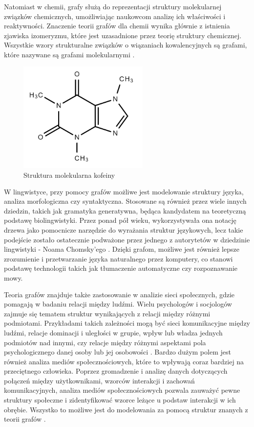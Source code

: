 Natomiast w chemii, grafy służą do reprezentacji struktury molekularnej związków chemicznych,
umożliwiając naukowcom analizę ich właściwości i reaktywności.
Znaczenie teorii grafów dla chemii wynika głównie z istnienia zjawiska izomeryzmu,
które jest uzasadnione przez teorię struktury chemicznej.
Wszystkie wzory strukturalne związków o wiązaniach kowalencyjnych są grafami,
które nazywane są grafami molekularnymi \cite{Balaban1985}.

\begin{figure}[ht]
	\centering
	\includegraphics[height=5.5cm]{partials/images/intro_chem.png}
	\caption{Struktura molekularna kofeiny}
    \label{Fig:intro-4}
\end{figure}

W lingwistyce, przy pomocy grafów możliwe jest modelowanie struktury języka, analiza morfologiczna czy syntaktyczna.
Stosowane są również przez wiele innych dziedzin, takich jak gramatyka generatywna,
będąca kandydatem na teoretyczną podstawę biolingwistyki.
Przez ponad pół wieku, wykorzystywała ona notację drzewa jako pomocnicze narzędzie do wyrażania struktur językowych,
lecz takie podejście zostało ostatecznie podważone przez jednego z autorytetów w dziedzinie lingwistyki - Noama Chomsky'ego \cite{Arikawa2019}.
Dzięki grafom, możliwe jest również lepsze zrozumienie i przetwarzanie języka naturalnego przez komputery,
co stanowi podstawę technologii takich jak tłumaczenie automatyczne czy rozpoznawanie mowy.

Teoria grafów znajduje także zastosowanie w analizie sieci społecznych, gdzie pomagają w badaniu relacji między ludźmi.
Wielu psychologów i socjologów zajmuje się tematem struktur wynikających z relacji między różnymi podmiotami.
Przykładami takich zależności mogą być sieci komunikacyjne między ludźmi, relacje dominacji i uległości w grupie,
wpływ lub władza jednych podmiotów nad innymi, czy relacje między różnymi aspektami pola psychologicznego danej osoby lub jej osobowości \cite{Harary1953}.
Bardzo dużym polem jest również analiza mediów społecznościowych, które to wpływają coraz bardziej na przeciętnego człowieka.
Poprzez gromadzenie i analizę danych dotyczących połączeń między użytkownikami, wzorców interakcji i zachowań komunikacyjnych,
analiza mediów społecznościowych pozwala zauważyć pewne struktury społeczne i zidentyfikować wzorce leżące u podstaw interakcji w ich obrębie.
Wszystko to możliwe jest do modelowania za pomocą struktur znanych z teorii grafów \cite{Umami2024}.

